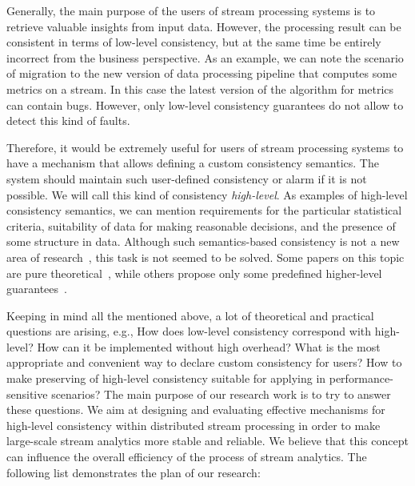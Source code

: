 Generally, the main purpose of the users of stream processing systems is to retrieve valuable insights from input data. However, the processing result can be consistent in terms of low-level consistency, but at the same time be entirely incorrect from the business perspective. As an example, we can note the scenario of migration to the new version of data processing pipeline that computes some metrics on a stream. In this case the latest version of the algorithm for metrics can contain bugs. However, only low-level consistency guarantees do not allow to detect this kind of faults.

Therefore, it would be extremely useful for users of stream processing systems to have a mechanism that allows defining a custom consistency semantics. The system should maintain such user-defined consistency or alarm if it is not possible. We will call this kind of consistency {\em high-level}. As examples of high-level consistency semantics, we can mention requirements for the particular statistical criteria, suitability of data for making reasonable decisions, and the presence of some structure in data. Although such semantics-based consistency is not a new area of research~\cite{Garcia-Molina:1983:USK:319983.319985}, this task is not seemed to be solved. Some papers on this topic are pure theoretical~\cite{Rodriguez:2008:ITA:1463434.1463480, Guo:2010:CMS:1822018.1822052}, while others propose only some predefined higher-level guarantees~\cite{Mihaila:2008:AIO:1458082.1458132, Fischer:2010:SSP:1739041.1739068}.

Keeping in mind all the mentioned above, a lot of theoretical and practical questions are arising, e.g., How does low-level consistency correspond with high-level? How can it be implemented without high overhead? What is the most appropriate and convenient way to declare custom consistency for users? How to make preserving of high-level consistency suitable for applying in performance-sensitive scenarios? The main purpose of our research work is to try to answer these questions. We aim at designing and evaluating effective mechanisms for high-level consistency within distributed stream processing in order to make large-scale stream analytics more stable and reliable. We believe that this concept can influence the overall efficiency of the process of stream analytics. The following list demonstrates the plan of our research:

